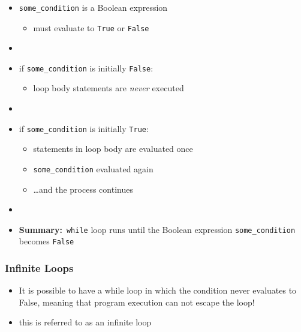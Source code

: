 \documentclass[english,14pt]{beamer}
\begin{document}
\begin{frame}[fragile]

\frametitle{}

\begin{itemize}
	\item \texttt{some\_condition} is a Boolean expression
	\begin{itemize}
		\item must evaluate to \texttt{True} or \texttt{False}
	\end{itemize}
	
	\item[]
	
	\item if \texttt{some\_condition} is initially \texttt{False}:
	\begin{itemize}
		\item loop body statements are \emph{never} executed
	\end{itemize}

	\item[]
	
	\item if \texttt{some\_condition} is initially \texttt{True}:
	\begin{itemize}
		\item statements in loop body are evaluated once
		\item \texttt{some\_condition} evaluated again
		\item \ldots and the process continues
	\end{itemize}
	
	\item[]
	
	\item[] \textbf{Summary:}~\texttt{while} loop runs until the Boolean expression \texttt{some\_condition} becomes \texttt{False}
\end{itemize}

\end{frame}


\begin{frame}[fragile]

\frametitle{Infinite Loops}

\begin{itemize}
	\item It is possible to have a while loop in which the condition never evaluates to False, meaning that program execution can not escape the loop!
	\item this is referred to as an infinite loop
\end{itemize}

\end{frame}
\end{document}
